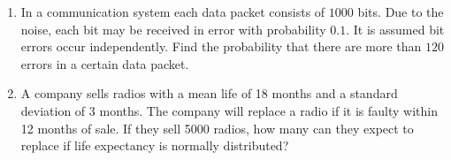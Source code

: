 \documentclass{book}
\begin{document}
\begin{enumerate}
	\item In a communication system each data packet consists of $1000$ bits. Due to the noise, each bit may be received in error with probability $0.1$. It is assumed bit errors occur independently. Find the probability that there are more than $120$ errors in a certain data packet.
	\item A company sells radios with a mean life of 18 months and a standard deviation of 3 months. The company will replace a radio if it is faulty within 12 months of sale. If they sell 5000 radios, how many can they expect to replace if life expectancy is normally distributed?
\end{enumerate}
\end{document}
